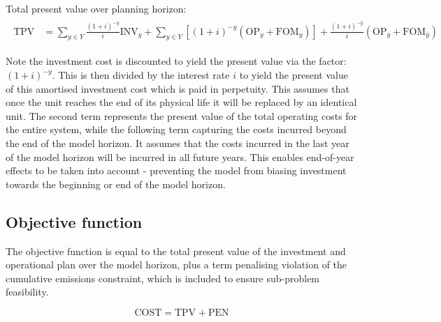 \documentclass{article}
\newcommand{\sYears}{Y}
\newcommand{\iGenerator}{g}
\newcommand{\iYear}{y}
\newcommand{\iYearTerminal}{\overline{\iYear}}
\newcommand{\iScenario}{s}
\newcommand{\cOperatingCost}[1][\iYear,\iScenario]{\mathrm{OP}_{#1}}
\newcommand{\cFixedOperationsMaintenanceCost}[1][\iGenerator]{\mathrm{FOM}_{#1}}
\newcommand{\cInvestmentCost}[1][\iYear]{\mathrm{INV}_{#1}}
\newcommand{\cInterestRate}{i}
\newcommand{\cTotalPresentValue}[1][]{\mathrm{TPV}_{#1}}
\newcommand{\cEmissionsViolationTotalCost}{\mathrm{PEN}}
\newcommand{\cObjectiveFunction}{\mathrm{COST}}
\begin{document}
Total present value over planning horizon:
\begin{align}
	\begin{split}
		\cTotalPresentValue & = \sum\limits_{\iYear \in \sYears} \frac{(1+\cInterestRate)^{-\iYear}}{\cInterestRate}\cInvestmentCost + \sum\limits_{\iYear \in \sYears} \left[(1+\cInterestRate)^{-\iYear} (\cOperatingCost[\iYear] + \cFixedOperationsMaintenanceCost[\iYear]) \right] + \frac{(1+\cInterestRate)^{-\iYearTerminal}}{\cInterestRate} \left(\cOperatingCost[\iYearTerminal] + \cFixedOperationsMaintenanceCost[\iYearTerminal] \right)
	\end{split}
\end{align}

Note the investment cost is discounted to yield the present value via the factor: $(1+\cInterestRate)^{-\iYear}$. This is then divided by the interest rate $i$ to yield the present value of this amortised investment cost which is paid in perpetuity. This assumes that once the unit reaches the end of its physical life it will be replaced by an identical unit. The second term represents the present value of the total operating costs for the entire system, while the following term capturing the costs incurred beyond the end of the model horizon. It assumes that the costs incurred in the last year of the model horizon will be incurred in all future years. This enables end-of-year effects to be taken into account - preventing the model from biasing investment towards the beginning or end of the model horizon.

\subsection{Objective function}
The objective function is equal to the total present value of the investment and operational plan over the model horizon, plus a term penalising violation of the cumulative emissions constraint, which is included to ensure sub-problem feasibility.

\begin{equation}
	\cObjectiveFunction = \cTotalPresentValue + \cEmissionsViolationTotalCost
\end{equation}
\end{document}
